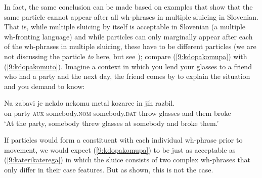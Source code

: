 \documentclass[output=paper,modfonts,newtxmath,hidelinks]{langscibook}
\begin{document}
\noindent In fact, the same conclusion can be made based on examples that show that the same particle cannot appear after all wh-phrases in multiple sluicing in Slovenian. That is, while multiple sluicing by itself is acceptable in Slovenian (a multiple wh-fronting language) and while particles can only marginally appear after each of the wh-phrases in multiple sluicing, these have to be different particles (we are not discussing the particle \textit{to} here, but see \citealt{marusicetal2015}); compare (\ref{9:kdopakomupa}) with (\ref{9:kdopakomuto}). Imagine a context in which you lend your glasses to a friend who had a party and the next day, the friend comes by to explain the situation and you demand to know:  

\begin{exe}
\ex \gll 
Na zabavi je nekdo nekomu metal kozarce in jih razbil. \\
on party \textsc{aux} somebody.\textsc{nom} somebody.\textsc{dat} throw glasses and them broke\\
\trans `At the party, somebody threw glasses at somebody and broke them.'

\ex \label{9:kdokomuvsi}\begin{xlist}
\label{9:kdokomu}
 \label{9:kdopakomupa}
\label{9:kdokomupa}
\label{9:kdopakomu}
\label{9:kdopakomuto}
\end{xlist}\end{exe}

\noindent If particles would form a constituent with each individual wh-phrase prior to movement, we would expect (\ref{9:kdopakomupa}) to be just as acceptable as (\ref{9:katerikaterega}) in which the sluice consists of two complex wh-phrases that only differ in their case features. But as shown, this is not the case. 
\end{document}
